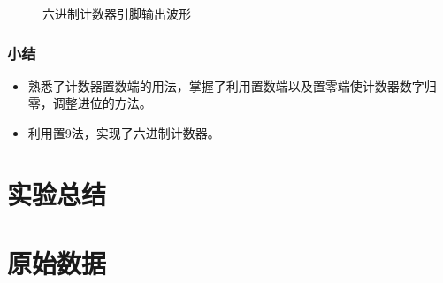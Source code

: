 \documentclass[UTF8]{ctexart}
\numberwithin{figure}{subsection}
\numberwithin{table}{subsection}
\numberwithin{equation}{subsection}
\begin{document}
\begin{figure}[H]
    \centering

    \caption{六进制计数器引脚输出波形}
    \label{6set9}
\end{figure}

\subsubsection{小结}
\begin{itemize}
    \item 熟悉了计数器置数端的用法，掌握了利用置数端以及置零端使计数器数字归零，调整进位的方法。
    \item 利用置9法，实现了六进制计数器。
\end{itemize}




\section{实验总结}


\section*{原始数据}

\end{document}
